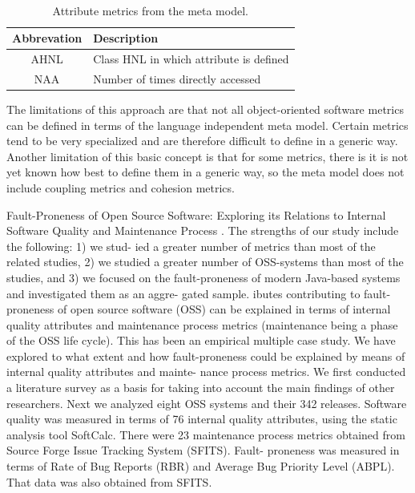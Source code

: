 \begin{table}
	\caption{Attribute metrics from the meta model.}~\label{tab:attributesmetrics}
	
	\setlength\tabcolsep{3pt}
	\renewcommand{\arraystretch}{1.4}%
	\begin{tabularx}{\columnwidth}{ | c | p{7cm} | }
		\hline
		Abbrevation & Description \\ \hline\hline
		AHNL & Class HNL in which attribute is defined \\ \hline
		NAA & Number of times directly accessed \\ \hline
	\end{tabularx}
\end{table}

The limitations of this approach are that not all object-oriented software metrics can be defined in terms of the language independent meta model. Certain metrics tend to be very specialized and are therefore difficult to define in a generic way. Another limitation of this basic concept is that for some metrics, there is it is not yet known how best to define them in a generic way, so the meta model does not include coupling metrics and cohesion metrics.

Fault-Proneness of Open Source Software: Exploring its Relations to
Internal Software Quality and Maintenance Process \cite{kozlov2013fault}. The strengths of our study include the following: 1) we stud-
ied a greater number of metrics than most of the related studies, 2) we studied a greater number of OSS-systems than most
of the studies, and 3) we focused on the fault-proneness of modern Java-based systems and investigated them as an aggre-
gated sample.
ibutes contributing to fault-proneness of open source
software (OSS) can be explained in terms of internal quality
attributes and maintenance process metrics (maintenance
being a phase of the OSS life cycle).
This has been an empirical multiple case study. We have
explored to what extent and how fault-proneness could be
explained by means of internal quality attributes and mainte-
nance process metrics. We first conducted a literature survey
as a basis for taking into account the main findings of other
researchers. Next we analyzed eight OSS systems and their
342 releases.
Software quality was measured in terms of 76 internal
quality attributes, using the static analysis tool SoftCalc.
There were 23 maintenance process metrics obtained from
Source Forge Issue Tracking System (SFITS). Fault-
proneness was measured in terms of Rate of Bug Reports
(RBR) and Average Bug Priority Level (ABPL). That data
was also obtained from SFITS.

